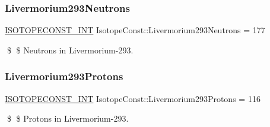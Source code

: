 \subsubsection{\texorpdfstring{Livermorium293\+Neutrons}{Livermorium293Neutrons}}
{\footnotesize\ttfamily \mbox{\hyperlink{group___isotope_const-_macros_ga5f18360b3e99483a35c32d789e62621c}{I\+S\+O\+T\+O\+P\+E\+C\+O\+N\+S\+T\+\_\+\+I\+NT}} Isotope\+Const\+::\+Livermorium293\+Neutrons = 177}

\$ \$ Neutrons in Livermorium-\/293. \mbox{\label{group___isotope_const-_livermorium-_lv293_gadb7ed7242375f066381df564d00707a7}} 
\subsubsection{\texorpdfstring{Livermorium293\+Protons}{Livermorium293Protons}}
{\footnotesize\ttfamily \mbox{\hyperlink{group___isotope_const-_macros_ga5f18360b3e99483a35c32d789e62621c}{I\+S\+O\+T\+O\+P\+E\+C\+O\+N\+S\+T\+\_\+\+I\+NT}} Isotope\+Const\+::\+Livermorium293\+Protons = 116}

\$ \$ Protons in Livermorium-\/293. 
